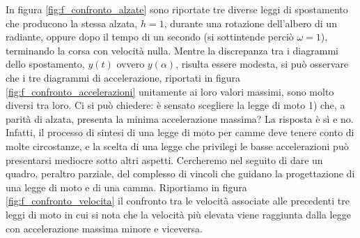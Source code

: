\noindent In  figura \ref{fig:f_confronto_alzate} sono riportate tre diverse leggi
di spostamento che producono la stessa alzata, $h=1$, durante una rotazione
dell'albero di un radiante, oppure dopo il tempo di un secondo (si sottintende
perci\`o $\omega=1$), terminando la corsa con velocit\`a nulla.
Mentre la discrepanza
tra i diagrammi dello spostamento, $y(t)$ ovvero $y(\alpha)$,
risulta essere modesta, 
si pu\`o osservare che i tre diagrammi di accelerazione,
riportati in figura \ref{fig:f_confronto_accelerazioni}
unitamente ai loro valori massimi, sono molto diversi tra loro.
Ci si pu\`o chiedere: \`e sensato scegliere la
legge di moto 1) che, a parit\`a di alzata, presenta la minima accelerazione
massima? La risposta \`e s\`i e no. Infatti, il processo di sintesi
di una legge di moto per camme deve tenere conto di molte
circostanze, e la scelta di una legge che privilegi le basse accelerazioni pu\`o
presentarsi mediocre sotto altri aspetti. Cercheremo nel seguito
 di dare un 
quadro, peraltro parziale, del complesso di vincoli che guidano
la progettazione di una legge di moto e di una camma.
Riportiamo in figura \ref{fig:f_confronto_velocita}
il confronto tra le velocit\`a associate alle precedenti tre leggi di
moto in cui si nota che la velocit\`a pi\`u elevata viene raggiunta 
dalla legge con accelerazione massima minore
e viceversa.
